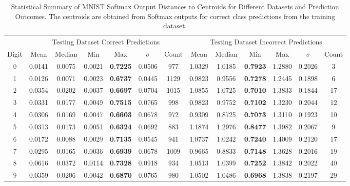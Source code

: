 \begin{table}[ht]
\begin{tabular}{c|cccccc|cccccc}
& \multicolumn{6}{c|}{Testing Dataset Correct Predictions} & \multicolumn{6}{c}{Testing Dataset Incorrect Predictions} \\
Digit & Mean & Median & Min & Max & $\sigma$ & Count & Mean & Median & Min & Max & $\sigma$ & Count \\ \hline
0 & 0.0141 & 0.0075 & 0.0021 & \textbf{0.7225} & 0.0506 & 977 & 1.0329 & 1.0185 & \textbf{0.7923} & 1.2880 & 0.2026 & 3 \\
1 & 0.0126 & 0.0071 & 0.0023 & \textbf{0.6737} & 0.0445 & 1129 & 0.9823 & 0.9556 & \textbf{0.7278} & 1.2445 & 0.1898 & 6 \\
2 & 0.0354 & 0.0202 & 0.0037 & \textbf{0.6697} & 0.0704 & 1015 & 1.0855 & 1.0725 & \textbf{0.7010} & 1.3833 & 0.1844 & 17 \\
3 & 0.0331 & 0.0177 & 0.0049 & \textbf{0.7515} & 0.0765 & 998 & 0.9823 & 0.9752 & \textbf{0.7102} & 1.3230 & 0.2044 & 12 \\
4 & 0.0306 & 0.0169 & 0.0047 & \textbf{0.6603} & 0.0678 & 972 & 0.9309 & 0.8725 & \textbf{0.7073} & 1.3110 & 0.1923 & 10 \\
5 & 0.0313 & 0.0173 & 0.0051 & \textbf{0.6324} & 0.0692 & 883 & 1.1874 & 1.2976 & \textbf{0.8477} & 1.3982 & 0.2067 & 9 \\
6 & 0.0172 & 0.0088 & 0.0029 & \textbf{0.7135} & 0.0545 & 941 & 1.0737 & 1.0242 & \textbf{0.7240} & 1.4009 & 0.2120 & 17 \\
7 & 0.0295 & 0.0165 & 0.0036 & \textbf{0.6939} & 0.0678 & 1009 & 0.9665 & 0.8833 & \textbf{0.7148} & 1.3628 & 0.2016 & 19 \\
8 & 0.0616 & 0.0372 & 0.0114 & \textbf{0.7328} & 0.0918 & 934 & 1.0513 & 1.0399 & \textbf{0.7252} & 1.3842 & 0.2022 & 40 \\
9 & 0.0359 & 0.0206 & 0.0042 & \textbf{0.6870} & 0.0765 & 980 & 1.0502 & 1.0486 & \textbf{0.6968} & 1.3838 & 0.2197 & 29 \\ \hline
\end{tabular}
\captionsetup{justification=raggedright,singlelinecheck=false}
\caption{Statistical Summary of MNIST Softmax Output Distances to Centroids for Different Datasets and Prediction Outcomes. The centroids are obtained from Softmax outputs for correct class predictions from the training dataset.}
\label{tab:distance_to_centroid}
\end{table}

